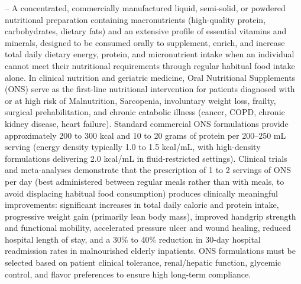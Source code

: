 -- A concentrated, commercially manufactured liquid, semi-solid, or powdered nutritional preparation containing macronutrients (high-quality protein, carbohydrates, dietary fats) and an extensive profile of essential vitamins and minerals, designed to be consumed orally to supplement, enrich, and increase total daily dietary energy, protein, and micronutrient intake when an individual cannot meet their nutritional requirements through regular habitual food intake alone. In clinical nutrition and geriatric medicine, Oral Nutritional Supplements (ONS) serve as the first-line nutritional intervention for patients diagnosed with or at high risk of Malnutrition, Sarcopenia, involuntary weight loss, frailty, surgical prehabilitation, and chronic catabolic illness (cancer, COPD, chronic kidney disease, heart failure). Standard commercial ONS formulations provide approximately 200 to 300 kcal and 10 to 20 grams of protein per 200--250 mL serving (energy density typically 1.0 to 1.5 kcal/mL, with high-density formulations delivering 2.0 kcal/mL in fluid-restricted settings). Clinical trials and meta-analyses demonstrate that the prescription of 1 to 2 servings of ONS per day (best administered between regular meals rather than with meals, to avoid displacing habitual food consumption) produces clinically meaningful improvements: significant increases in total daily caloric and protein intake, progressive weight gain (primarily lean body mass), improved handgrip strength and functional mobility, accelerated pressure ulcer and wound healing, reduced hospital length of stay, and a 30\% to 40\% reduction in 30-day hospital readmission rates in malnourished elderly inpatients. ONS formulations must be selected based on patient clinical tolerance, renal/hepatic function, glycemic control, and flavor preferences to ensure high long-term compliance.

